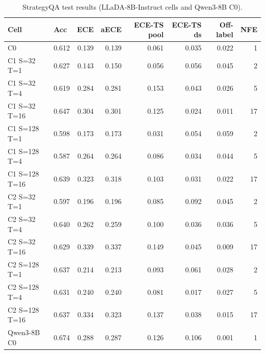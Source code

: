\begin{table}[h!]
\centering
\small
\caption{StrategyQA test results (LLaDA-8B-Instruct cells and Qwen3-8B C0).}
\label{tab:main_strategyqa}
\begin{tabular}{llrrrrrr}
\toprule
Cell & Acc & ECE & aECE & ECE-TS pool & ECE-TS ds & Off-label & NFE \\
\midrule
C0 & 0.612 & 0.139 & 0.139 & 0.061 & 0.035 & 0.022 & 1 \\
C1 S=32 T=1 & 0.627 & 0.143 & 0.150 & 0.056 & 0.056 & 0.045 & 2 \\
C1 S=32 T=4 & 0.619 & 0.284 & 0.281 & 0.153 & 0.043 & 0.026 & 5 \\
C1 S=32 T=16 & 0.647 & 0.304 & 0.301 & 0.125 & 0.024 & 0.011 & 17 \\
C1 S=128 T=1 & 0.598 & 0.173 & 0.173 & 0.031 & 0.054 & 0.059 & 2 \\
C1 S=128 T=4 & 0.587 & 0.264 & 0.264 & 0.086 & 0.034 & 0.044 & 5 \\
C1 S=128 T=16 & 0.639 & 0.323 & 0.318 & 0.103 & 0.031 & 0.022 & 17 \\
C2 S=32 T=1 & 0.597 & 0.196 & 0.196 & 0.085 & 0.092 & 0.045 & 2 \\
C2 S=32 T=4 & 0.640 & 0.262 & 0.259 & 0.100 & 0.036 & 0.036 & 5 \\
C2 S=32 T=16 & 0.629 & 0.339 & 0.337 & 0.149 & 0.045 & 0.009 & 17 \\
C2 S=128 T=1 & 0.637 & 0.214 & 0.213 & 0.093 & 0.061 & 0.028 & 2 \\
C2 S=128 T=4 & 0.631 & 0.240 & 0.240 & 0.081 & 0.017 & 0.027 & 5 \\
C2 S=128 T=16 & 0.637 & 0.334 & 0.323 & 0.137 & 0.038 & 0.015 & 17 \\
Qwen3-8B C0 & 0.674 & 0.288 & 0.287 & 0.126 & 0.106 & 0.001 & 1 \\
\bottomrule
\end{tabular}
\end{table}
